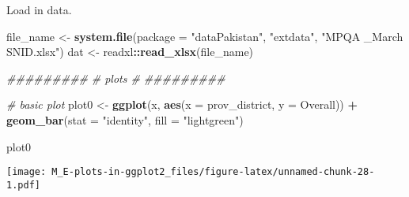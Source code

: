 \documentclass[]{article}
\newenvironment{Shaded}{\begin{snugshade}}{\end{snugshade}}
\newcommand{\CommentTok}[1]{\textcolor[rgb]{0.56,0.35,0.01}{\textit{#1}}}
\newcommand{\DataTypeTok}[1]{\textcolor[rgb]{0.13,0.29,0.53}{#1}}
\newcommand{\KeywordTok}[1]{\textcolor[rgb]{0.13,0.29,0.53}{\textbf{#1}}}
\newcommand{\NormalTok}[1]{#1}
\newcommand{\OperatorTok}[1]{\textcolor[rgb]{0.81,0.36,0.00}{\textbf{#1}}}
\newcommand{\StringTok}[1]{\textcolor[rgb]{0.31,0.60,0.02}{#1}}
\begin{document}
Load in data.

\begin{Shaded}
\begin{Highlighting}[]
\NormalTok{file_name <-}\StringTok{ }\KeywordTok{system.file}\NormalTok{(}\DataTypeTok{package =} \StringTok{"dataPakistan"}\NormalTok{, }\StringTok{"extdata"}\NormalTok{, }\StringTok{"MPQA _March SNID.xlsx"}\NormalTok{)}
\NormalTok{dat <-}\StringTok{ }\NormalTok{readxl}\OperatorTok{::}\KeywordTok{read_xlsx}\NormalTok{(file_name)}
\end{Highlighting}
\end{Shaded}

\begin{Shaded}
\end{Shaded}

\begin{Shaded}
\begin{Highlighting}[]
\CommentTok{#########}
\CommentTok{# plots #}
\CommentTok{#########}

\CommentTok{# basic plot}
\NormalTok{plot0 <-}\StringTok{ }
\StringTok{  }\KeywordTok{ggplot}\NormalTok{(x, }\KeywordTok{aes}\NormalTok{(}\DataTypeTok{x =}\NormalTok{ prov_district, }\DataTypeTok{y =}\NormalTok{ Overall)) }\OperatorTok{+}
\StringTok{  }\KeywordTok{geom_bar}\NormalTok{(}\DataTypeTok{stat =} \StringTok{"identity"}\NormalTok{, }\DataTypeTok{fill =} \StringTok{"lightgreen"}\NormalTok{)}

\NormalTok{plot0}
\end{Highlighting}
\end{Shaded}

\texttt{[image: M\_E-plots-in-ggplot2\_files/figure-latex/unnamed-chunk-28-1.pdf]}
\end{document}
